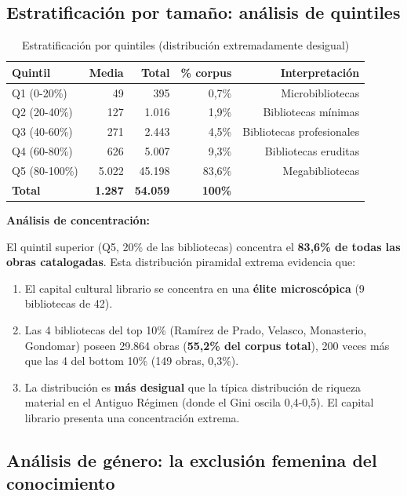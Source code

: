 \documentclass[12pt,a4paper]{article}
\begin{document}
\subsection{Estratificación por tamaño: análisis de quintiles}

\begin{table}[h]
\centering
\begin{tabular}{lrrrr}
\toprule
\textbf{Quintil} & \textbf{Media} & \textbf{Total} & \textbf{\% corpus} & \textbf{Interpretación} \\
\midrule
Q1 (0-20\%) & 49 & 395 & 0,7\% & Microbibliotecas \\
Q2 (20-40\%) & 127 & 1.016 & 1,9\% & Bibliotecas mínimas \\
Q3 (40-60\%) & 271 & 2.443 & 4,5\% & Bibliotecas profesionales \\
Q4 (60-80\%) & 626 & 5.007 & 9,3\% & Bibliotecas eruditas \\
\rowcolor{yellow!30}
Q5 (80-100\%) & 5.022 & 45.198 & 83,6\% & Megabibliotecas \\
\midrule
\textbf{Total} & \textbf{1.287} & \textbf{54.059} & \textbf{100\%} & \\
\bottomrule
\end{tabular}
\caption{Estratificación por quintiles (distribución extremadamente desigual)}
\end{table}

\textbf{Análisis de concentración:}

El quintil superior (Q5, 20\% de las bibliotecas) concentra el \textbf{83,6\% de todas las obras catalogadas}. Esta distribución piramidal extrema evidencia que:

\begin{enumerate}
\item El capital cultural librario se concentra en una \textbf{élite microscópica} (9 bibliotecas de 42).

\item Las 4 bibliotecas del top 10\% (Ramírez de Prado, Velasco, Monasterio, Gondomar) poseen 29.864 obras (\textbf{55,2\% del corpus total}), 200 veces más que las 4 del bottom 10\% (149 obras, 0,3\%).

\item La distribución es \textbf{más desigual} que la típica distribución de riqueza material en el Antiguo Régimen (donde el Gini oscila 0,4-0,5). El capital librario presenta una concentración extrema.
\end{enumerate}

\subsection{Análisis de género: la exclusión femenina del conocimiento}
\end{document}
